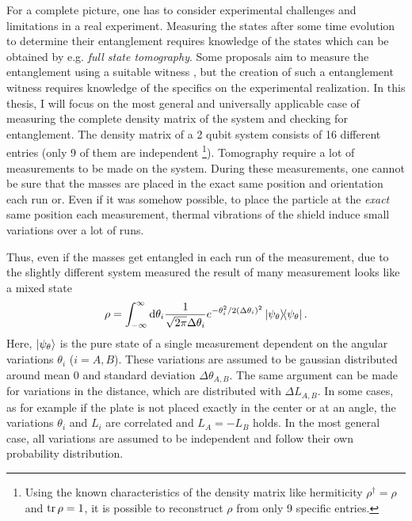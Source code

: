 For a complete picture, one has to consider experimental challenges and limitations in a real experiment. 
Measuring the states after some time evolution to determine their entanglement requires knowledge of the states which can be obtained by e.g. \emph{full state tomography}. Some proposals aim to measure the entanglement using a suitable witness \cite{Bose_2017,Chevalier_2020}, but the creation of such a entanglement witness requires knowledge of the specifics on the experimental realization.
In this thesis, I will focus on the most general and universally applicable case of measuring the complete density matrix of the system and checking for entanglement.
The density matrix of a 2 qubit system consists of 16 different entries (only 9 of them are independent \footnote{Using the known characteristics of the density matrix like hermiticity $\rho^\dagger = \rho$ and $\tr \rho = 1$, it is possible to reconstruct $\rho$ from only 9 specific entries.}).
Tomography require a lot of measurements to be made on the system.
During these measurements, one cannot be sure that the masses are placed in the exact same position and orientation each run or.
Even if it was somehow possible, to place the particle at the \textit{exact} same position each measurement, thermal vibrations of the shield induce small variations over a lot of runs.

Thus, even if the masses get entangled in each run of the measurement, due to the slightly different system measured the result of many measurement looks like a mixed state
\begin{equation}
  \rho = \int_{-\infty}^{\infty} \dd \theta_i \frac{1}{\sqrt{2\pi}\Delta \theta_i} e^{-\theta_i^2/2(\Delta \theta_i)^2} \ketbra{\psi_\theta} .
\end{equation}
Here, $\ket{\psi_\theta}$ is the pure state of a single measurement dependent on the angular variations $\theta_i$ ($i=A,B$). These variations are assumed to be gaussian distributed around mean $0$ and standard deviation $\Delta \theta_{A,B}$.
The same argument can be made for variations in the distance, which are distributed with $\Delta L_{A,B}$.
In some cases, as for example if the plate is not placed exactly in the center or at an angle, the variations $\theta_i$ and $L_i$ are correlated and $L_A = -L_B$ holds.
In the most general case, all variations are assumed to be independent and follow their own probability distribution.









